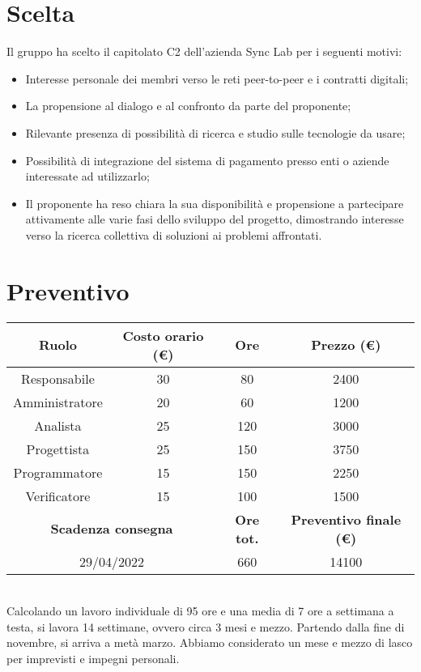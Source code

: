 \documentclass[a4paper, 12pt]{article}
\begin{document}
\makefrontpage

\section{Scelta}\label{scelta}
Il gruppo ha scelto il capitolato C2 dell’azienda Sync Lab per i seguenti motivi:
\begin{itemize}
\item Interesse personale dei membri verso le reti peer-to-peer e i contratti digitali;
\item La propensione al dialogo e al confronto da parte del proponente;
\item Rilevante presenza di possibilità di ricerca e studio sulle tecnologie da usare;
\item Possibilità di integrazione del sistema di pagamento presso enti o aziende interessate ad utilizzarlo;
\item Il proponente ha reso chiara la sua disponibilità e propensione a partecipare attivamente alle varie fasi dello sviluppo del progetto, dimostrando interesse verso la ricerca collettiva di soluzioni ai problemi affrontati.
\end{itemize}

\section{Preventivo}\label{preventivo}
\begin{tabular}{|c|c|c|c|}
    \hline
    \textbf{Ruolo} & \textbf{Costo orario (\euro)} & \textbf{Ore} & \textbf{Prezzo (\euro)}\\
    \hline
    Responsabile & 30 & 80 & 2400\\
    \hline
    Amministratore & 20 & 60 & 1200\\
    \hline
    Analista & 25 & 120 & 3000\\
    \hline
    Progettista & 25 & 150 & 3750\\
    \hline
    Programmatore & 15 & 150 & 2250\\
    \hline
    Verificatore & 15 & 100 & 1500\\
    \hline\hline
    \multicolumn{2}{|c|}{\textbf{Scadenza consegna}} & \textbf{Ore tot.} & \textbf{Preventivo finale (\euro)}\\
    \hline
    \multicolumn{2}{|c|}{29/04/2022} & 660 & 14100\\
    \hline
\end{tabular}\\[8pt]

Calcolando un lavoro individuale di 95 ore e una media di 7 ore a settimana a testa, si lavora 14 settimane, ovvero circa 3 mesi e mezzo.
Partendo dalla fine di novembre, si arriva a metà marzo. Abbiamo considerato un mese e mezzo di lasco per imprevisti e impegni personali.
\end{document}

